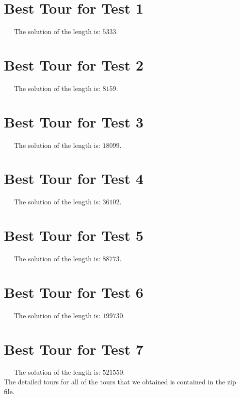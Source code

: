 \documentclass[11pt]{scrreprt}
\begin{document}
\section{Best Tour for Test 1}

\ \ \ The solution of the length is: $5333$.


\section{Best Tour for Test 2}

\ \ \ The solution of the length is: $8159$.


\section{Best Tour for Test 3}

\ \ \ The solution of the length is: $18099$.


\section{Best Tour for Test 4}

\ \ \ The solution of the length is: $36102$.


\section{Best Tour for Test 5}

\ \ \ The solution of the length is: $88773$.


\section{Best Tour for Test 6}

\ \ \ The solution of the length is: $199730$.


\section{Best Tour for Test 7}

\ \ \ The solution of the length is: $521550$.\\

The detailed tours for all of the tours that we obtained is contained in the zip file. 
\end{document}

